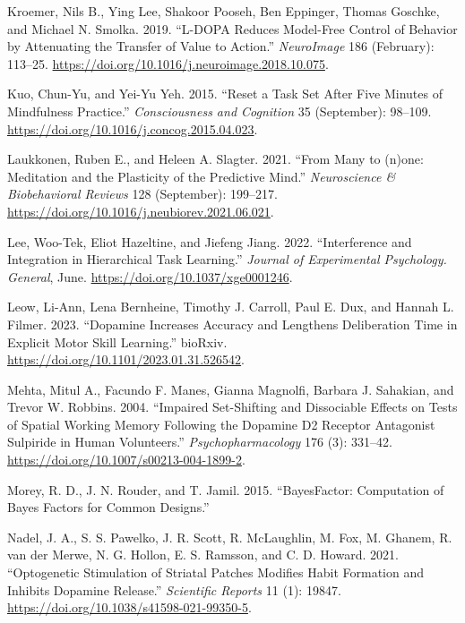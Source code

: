 \documentclass{article}
\newlength{\cslhangindent}
\newlength{\cslentryspacingunit} %
\newenvironment{CSLReferences}[2] %
 {%
  \setlength{\parindent}{0pt}
  \ifodd #1
  \let\oldpar\par
  \def\par{\hangindent=\cslhangindent\oldpar}
  \fi
  \setlength{\parskip}{#2\cslentryspacingunit}
 }%
 {}
\begin{document}
\begin{CSLReferences}{1}{0}
\leavevmode{}%
Kroemer, Nils B., Ying Lee, Shakoor Pooseh, Ben Eppinger, Thomas
Goschke, and Michael N. Smolka. 2019. {``L-{DOPA} Reduces Model-Free
Control of Behavior by Attenuating the Transfer of Value to Action.''}
\emph{NeuroImage} 186 (February): 113--25.
\url{https://doi.org/10.1016/j.neuroimage.2018.10.075}.

\leavevmode{}%
Kuo, Chun-Yu, and Yei-Yu Yeh. 2015. {``Reset a Task Set After Five
Minutes of Mindfulness Practice.''} \emph{Consciousness and Cognition}
35 (September): 98--109.
\url{https://doi.org/10.1016/j.concog.2015.04.023}.

\leavevmode{}%
Laukkonen, Ruben E., and Heleen A. Slagter. 2021. {``From Many to
(n)one: {Meditation} and the Plasticity of the Predictive Mind.''}
\emph{Neuroscience \& Biobehavioral Reviews} 128 (September): 199--217.
\url{https://doi.org/10.1016/j.neubiorev.2021.06.021}.

\leavevmode{}%
Lee, Woo-Tek, Eliot Hazeltine, and Jiefeng Jiang. 2022. {``Interference
and Integration in Hierarchical Task Learning.''} \emph{Journal of
Experimental Psychology. General}, June.
\url{https://doi.org/10.1037/xge0001246}.

\leavevmode{}%
Leow, Li-Ann, Lena Bernheine, Timothy J. Carroll, Paul E. Dux, and
Hannah L. Filmer. 2023. {``Dopamine Increases Accuracy and Lengthens
Deliberation Time in Explicit Motor Skill Learning.''} {bioRxiv}.
\url{https://doi.org/10.1101/2023.01.31.526542}.

\leavevmode{}%
Mehta, Mitul A., Facundo F. Manes, Gianna Magnolfi, Barbara J. Sahakian,
and Trevor W. Robbins. 2004. {``Impaired Set-Shifting and Dissociable
Effects on Tests of Spatial Working Memory Following the Dopamine {D2}
Receptor Antagonist Sulpiride in Human Volunteers.''}
\emph{Psychopharmacology} 176 (3): 331--42.
\url{https://doi.org/10.1007/s00213-004-1899-2}.

\leavevmode{}%
Morey, R. D., J. N. Rouder, and T. Jamil. 2015. {``{BayesFactor}:
{Computation} of {Bayes Factors} for {Common Designs}.''}

\leavevmode{}%
Nadel, J. A., S. S. Pawelko, J. R. Scott, R. McLaughlin, M. Fox, M.
Ghanem, R. van der Merwe, N. G. Hollon, E. S. Ramsson, and C. D. Howard.
2021. {``Optogenetic Stimulation of Striatal Patches Modifies Habit
Formation and Inhibits Dopamine Release.''} \emph{Scientific Reports} 11
(1): 19847. \url{https://doi.org/10.1038/s41598-021-99350-5}.


\end{CSLReferences}
\end{document}
